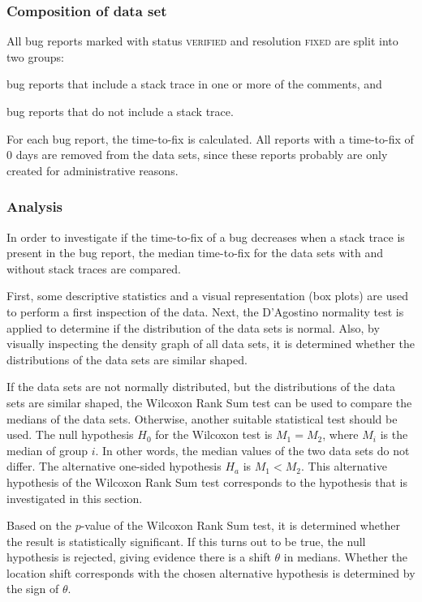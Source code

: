 \subsubsection{Composition of data set}
All bug reports marked with status \textsc{verified} and resolution \textsc{fixed} are split into two groups: 

\begin{enumerate*}
	\item bug reports that include a stack trace in one or more of the comments, and
	\item bug reports that do not include a stack trace.
\end{enumerate*}

For each bug report, the time-to-fix is calculated. All reports with a time-to-fix of $0$ days are removed from the data sets, since these reports probably are only created for administrative reasons.

\subsubsection{Analysis}
In order to investigate if the time-to-fix of a bug decreases when a stack trace is present in the bug report, the median time-to-fix for the data sets with and without stack traces are compared. 

First, some descriptive statistics and a visual representation (box plots) are used to perform a first inspection of the data. Next, the D'Agostino normality test is applied to determine if the distribution of the data sets is normal. Also, by visually inspecting the density graph of all data sets, it is determined whether the distributions of the data sets are similar shaped.

If the data sets are not normally distributed, but the distributions of the data sets are similar shaped, the Wilcoxon Rank Sum test can be used to compare the medians of the data sets. Otherwise, another suitable statistical test should be used. The null hypothesis $H_0$ for the Wilcoxon test is $M_1 = M_2$, where $M_i$ is the median of group $i$. In other words, the median values of the two data sets do not differ. The alternative one-sided hypothesis $H_a$ is $M_1 < M_2$. This alternative hypothesis of the Wilcoxon Rank Sum test corresponds to the hypothesis that is investigated in this section.

Based on the $p$-value of the Wilcoxon Rank Sum test, it is determined whether the result is statistically significant. If this turns out to be true, the null hypothesis is rejected, giving evidence there is a shift $\theta$ in medians. Whether the location shift corresponds with the chosen alternative hypothesis is determined by the sign of $\theta$.

